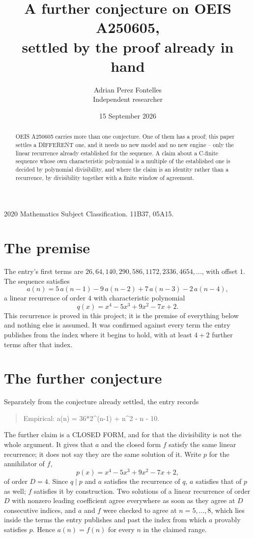 \documentclass[11pt,a4paper]{article}
\title{A further conjecture on OEIS A250605,\\ \large settled by the proof already in hand}
\author{Adrian Perez Fontelles\\ \small Independent researcher}
\date{15 September 2026}
\theoremstyle{plain}
\theoremstyle{definition}
\begin{document}
\maketitle

\begin{abstract}
OEIS A250605 carries more than one conjecture. One of them has a proof; this paper settles a
DIFFERENT one, and it needs no new model and no new engine -- only the linear recurrence already
established for the sequence. A claim about a C-finite sequence whose own characteristic
polynomial is a multiple of the established one is decided by polynomial divisibility, and where
the claim is an identity rather than a recurrence, by divisibility together with a finite window
of agreement.
\end{abstract}

\noindent\small 2020 Mathematics Subject Classification. 11B37, 05A15.\normalsize

\section{The premise}

The entry's first terms are $26, 64, 140, 290, 586, 1172, 2336, 4654,\dots$, with offset $1$. The sequence satisfies
\[
  a(n)=5\,a(n-1) - 9\,a(n-2) + 7\,a(n-3) - 2\,a(n-4) ,
\]
a linear recurrence of order $4$ with characteristic polynomial
\[
  q(x)=x^{4} - 5 x^{3} + 9 x^{2} - 7 x + 2 .
\]
This recurrence is proved in this project; it is the premise of everything below and nothing else is assumed.
It was confirmed against every term the entry publishes from the index where it begins to hold,
with at least $4+2$ further terms after that index.

\section{The further conjecture}

Separately from the conjecture already settled, the entry records

\begin{quote}\raggedright Empirical: a(n) = 36*2\^{}(n-1) + n\^{}2 - n - 10.\end{quote}

The further claim is a CLOSED FORM, and for that the divisibility is not the whole argument. It
gives that $a$ and the closed form $f$ satisfy the same linear recurrence; it does not say they
are the same solution of it. Write $p$ for the annihilator of $f$,
\[
  p(x)=x^{4} - 5 x^{3} + 9 x^{2} - 7 x + 2 ,
\]
of order $D=4$. Since $q\mid p$ and $a$ satisfies the recurrence of $q$, $a$ satisfies that of
$p$ as well; $f$ satisfies it by construction. Two solutions of a linear recurrence of order $D$
with nonzero leading coefficient agree everywhere as soon as they agree at $D$ consecutive
indices, and $a$ and $f$ were checked to agree at $n=5,\dots,8$,
which lies inside the terms the entry publishes and past the index from which $a$ provably
satisfies $p$. Hence $a(n)=f(n)$ for every $n$ in the claimed range.
\end{document}
